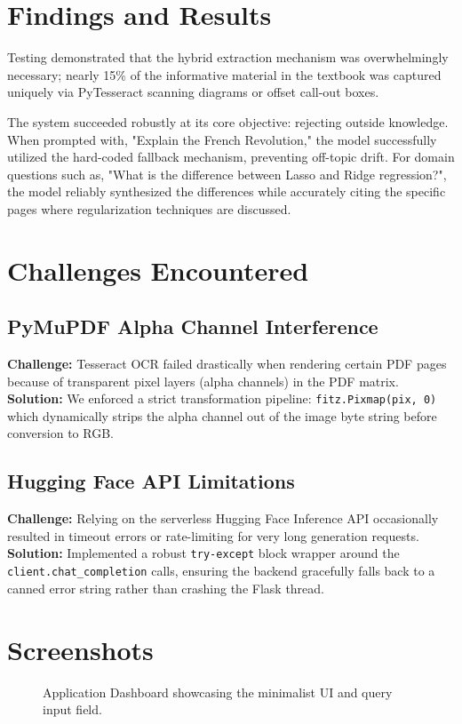 \documentclass[12pt,a4paper]{article}
\begin{document}
\section{Findings and Results}
Testing demonstrated that the hybrid extraction mechanism was overwhelmingly necessary; nearly 15\% of the informative material in the textbook was captured uniquely via PyTesseract scanning diagrams or offset call-out boxes.

The system succeeded robustly at its core objective: rejecting outside knowledge. When prompted with, "Explain the French Revolution," the model successfully utilized the hard-coded fallback mechanism, preventing off-topic drift. For domain questions such as, "What is the difference between Lasso and Ridge regression?", the model reliably synthesized the differences while accurately citing the specific pages where regularization techniques are discussed.

\section{Challenges Encountered}
\subsection{PyMuPDF Alpha Channel Interference}
\textbf{Challenge:} Tesseract OCR failed drastically when rendering certain PDF pages because of transparent pixel layers (alpha channels) in the PDF matrix. \\
\textbf{Solution:} We enforced a strict transformation pipeline: \texttt{fitz.Pixmap(pix, 0)} which dynamically strips the alpha channel out of the image byte string before conversion to RGB.

\subsection{Hugging Face API Limitations}
\textbf{Challenge:} Relying on the serverless Hugging Face Inference API occasionally resulted in timeout errors or rate-limiting for very long generation requests. \\
\textbf{Solution:} Implemented a robust \texttt{try-except} block wrapper around the \texttt{client.chat\_completion} calls, ensuring the backend gracefully falls back to a canned error string rather than crashing the Flask thread.

\section{Screenshots}
\vspace{1cm}
\begin{figure}[H]
    \centering
    \frame{\rule{0pt}{7cm}\rule{14cm}{0pt}} %
    \caption{Application Dashboard showcasing the minimalist UI and query input field.}
    \label{fig:screenshot1}
\end{figure}
\end{document}
